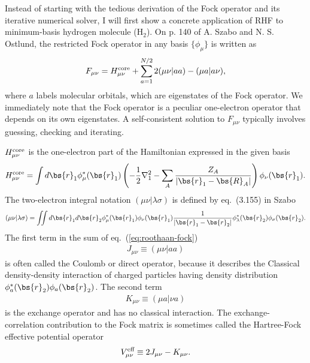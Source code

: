 Instead of starting with the tedious derivation of the Fock operator and its iterative numerical solver, I will first show a concrete application of RHF to minimum-basis hydrogen molecule (H$_2$). %
On p. 140 of A. Szabo and N. S. Ostlund, the restricted Fock operator in any basis $\{\phi_\mu\}$ is written as
\begin{align}
F_{\mu\nu} = H^{\text{core}}_{\mu\nu} + \sum\limits_{a=1}^{N/2} 2(\mu\nu|aa) - (\mu a|a\nu),
\end{align} %
where $a$ labels molecular orbitals, which are eigenstates of the Fock operator. We immediately note that the Fock operator is a peculiar one-electron operator that depends on its own eigenstates. A self-consistent solution to $F_{\mu\nu}$ typically involves guessing, checking and iterating.

$H^{\text{core}}_{\mu\nu}$ is the one-electron part of the Hamiltonian expressed in the given basis %
\begin{align} \label{eq:hf-hcore}
\hcore = \int d\bs{r}_1 \phi_\mu^*(\bs{r}_1)\left(
-\frac{1}{2}\nabla_1^2-\sum\limits_A \dfrac{Z_A}{\vert\bs{r}_1-\bs{R}_A\vert}
\right)  \phi_\nu(\bs{r}_1).
\end{align}
The two-electron integral notation $(\mu\nu|\lambda\sigma)$ is defined by eq.~(3.155) in Szabo
\begin{align} \label{eq:hf-eri}
(\mu\nu|\lambda\sigma) = \iint d\bs{r}_1 d\bs{r}_2 \phi_\mu^*(\bs{r}_1)\phi_{\nu}(\bs{r}_1)
\frac{1}{\vert\bs{r}_1-\bs{r}_2\vert}
\phi_\lambda^*(\bs{r}_2)\phi_\sigma(\bs{r}_2).
\end{align}
The first term in the sum of eq.~(\ref{eq:roothaan-fock})
\begin{align}
J_{\mu\nu} \equiv (\mu\nu|aa)
\end{align}
is often called the Coulomb or direct operator, because it describes the Classical density-density interaction of charged particles having density distribution $\phi_a^*(\bs{r}_2)\phi_a(\bs{r}_2)$. The second term
\begin{align}
K_{\mu\nu} \equiv (\mu a|\nu a)
\end{align}
is the exchange operator and has no classical interaction. The exchange-correlation contribution to the Fock matrix is sometimes called the Hartree-Fock effective potential operator
\begin{align}
V^{\text{eff}}_{\mu\nu}\equiv 2J_{\mu\nu} - K_{\mu\nu}.
\end{align}

